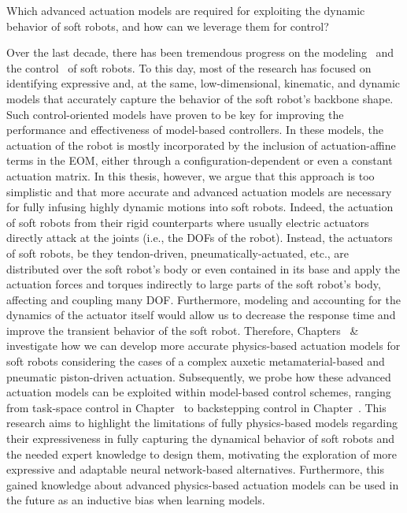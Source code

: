 \begin{researchquestion}\label{rq:actuation_models}
    Which advanced actuation models are required for exploiting the dynamic behavior of soft robots, and how can we leverage them for control? 
\end{researchquestion}
Over the last decade, there has been tremendous progress on the modeling~\cite{armanini2023soft} and the control~\cite{della2023model} of soft robots.
To this day, most of the research has focused on identifying expressive and, at the same, low-dimensional, kinematic, and dynamic models that accurately capture the behavior of the soft robot's backbone shape. Such control-oriented models have proven to be key for improving the performance and effectiveness of model-based controllers.
In these models, the actuation of the robot is mostly incorporated by the inclusion of actuation-affine terms in the \gls{EOM}, either through a configuration-dependent or even a constant actuation matrix.
In this thesis, however, we argue that this approach is too simplistic and that more accurate and advanced actuation models are necessary for fully infusing highly dynamic motions into soft robots.
Indeed, the actuation of soft robots from their rigid counterparts where usually electric actuators directly attack at the joints (i.e., the \glspl{DOF} of the robot). Instead, the actuators of soft robots, be they tendon-driven, pneumatically-actuated, etc., are distributed over the soft robot's body or even contained in its base and apply the actuation forces and torques indirectly to large parts of the soft robot's body, affecting and coupling many \gls{DOF}. 
Furthermore, modeling and accounting for the dynamics of the actuator itself would allow us to decrease the response time and improve the transient behavior of the soft robot.
Therefore, Chapters~\circled{\ref{chp:hsamodel}} \& \circled{\ref{chp:backstepping}} investigate how we can develop more accurate physics-based actuation models for soft robots considering the cases of a complex auxetic metamaterial-based and pneumatic piston-driven actuation.
Subsequently, we probe how these advanced actuation models can be exploited within model-based control schemes, ranging from task-space control in Chapter~\circled{\ref{chp:hsacontrol}} to backstepping control in Chapter~\circled{\ref{chp:backstepping}}.
This research aims to highlight the limitations of fully physics-based models regarding their expressiveness in fully capturing the dynamical behavior of soft robots and the needed expert knowledge to design them, motivating the exploration of more expressive and adaptable neural network-based alternatives.
Furthermore, this gained knowledge about advanced physics-based actuation models can be used in the future as an inductive bias when learning models.

